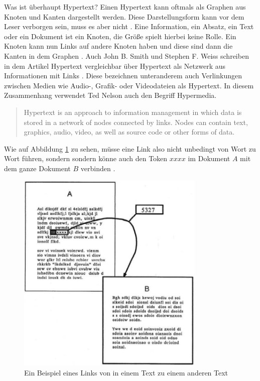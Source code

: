 \begin{section}{Was ist überhaupt Hypertext?}
Einen Hypertext kann oftmals als Graphen aus Knoten und Kanten dargestellt werden. Diese Darstellungsform kann vor dem Leser verborgen sein, muss es aber nicht \cite{Conklin1987}. Eine Information, ein Absatz, ein Text oder ein Dokument ist ein Knoten, die Größe spielt hierbei keine Rolle. Ein Knoten kann nun Links auf andere Knoten haben und diese sind dann die Kanten in dem Graphen \cite[S.19]{Conklin1987} \cite[S.2]{Nielsen1995}. Auch John B. Smith und Stephen F. Weiss schreiben in dem Artikel Hypertext vergleichbar über Hypertext als Netzwerk aus Informationen mit Links \cite{Smith1988}. Diese bezeichnen unteranderem auch Verlinkungen zwischen Medien wie Audio-, Grafik- oder Videodateien als Hypertext. In diesem Zusammenhang verwendet Ted Nelson auch den Begriff \glqq Hypermedia\grqq{ }\cite{Nelson1965}. 

\begin{quote}
    \glqq [...] Hypertext is an approach to information management in which data is stored in a network of nodes connected by links. Nodes can contain text, graphics, audio, video, as well as source code or other forms of data.\grqq{ }\cite{Smith1988}
\end{quote}

Wie auf Abbildung \ref{fig:imText} zu sehen, müsse eine Link also nicht unbedingt von Wort zu Wort führen, sondern sondern könne auch den Token $xxxx$ im Dokument $A$ mit dem ganze Dokument $B$ verbinden \cite{Conklin1987}. 

\begin{figure}[H]
	\centering
	\includegraphics[width=0.8\textwidth]{image/imText}
	\caption{Ein Beispiel eines Links von in einem Text zu einem anderen Text \cite[S.34]{Conklin1987}}
	\label{fig:imText}
\end{figure}


\end{section}
